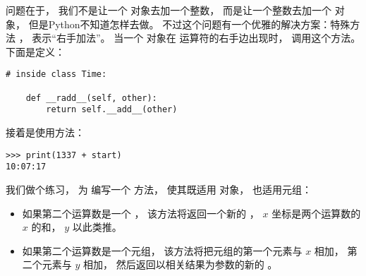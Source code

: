 问题在于， 我们不是让一个  对象去加一个整数，
而是让一个整数去加一个  对象， 但是Python不知道怎样去做。
不过这个问题有一个优雅的解决方案：特殊方法 ， 表示“右手加法”。
当一个  对象在 \li{+} 运算符的右手边出现时， 调用这个方法。    下面是定义：

  

\begin{lstlisting}
# inside class Time:

    def __radd__(self, other):
        return self.__add__(other)
\end{lstlisting}

%

接着是使用方法：

\begin{lstlisting}
>>> print(1337 + start)
10:07:17
\end{lstlisting}

%


我们做个练习， 为  编写一个  方法，
使其既适用  对象， 也适用元组：


\begin{itemize}

\item 如果第二个运算数是一个  ， 该方法将返回一个新的 ，
$x$ 坐标是两个运算数的 $x$ 的和，  $y$ 以此类推。

\item 如果第二个运算数是一个元组， 该方法将把元组的第一个元素与 $x$ 相加，
第二个元素与 $y$ 相加， 然后返回以相关结果为参数的新的 。

\end{itemize}


